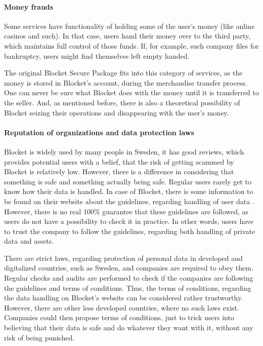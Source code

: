 \paragraph{Money frauds}
Some services have functionality of holding some of the user's money (like online casinos and such). In that case, users hand their money over to the third party, which maintains full control of those funds. If, for example, such company files for bankruptcy, users might find themselves left empty handed.

The original Blocket Secure Package fits into this category of services, as the money is stored in Blocket's account, during the merchandise transfer process. One can never be sure what Blocket does with the money until it is transferred to the seller. And, as mentioned before, there is also a theoretical possibility of Blocket seizing their operations and disappearing with the user's money.

\paragraph{Reputation of organizations and data protection laws}
Blocket is widely used by many people in Sweden, it has good reviews, which provides potential users with a belief, that the risk of getting scammed by Blocket is relatively low. However, there is a difference in considering that something is safe and something actually being safe. Regular users rarely get to know how their data is handled. In case of Blocket, there is some information to be found on their website about the guidelines, regarding handling of user data \citep{blocketuserdata}. However, there is no real 100\% guarantee that these guidelines are followed, as users do not have a possibility to check it in practice. In other words, users have to trust the company to follow the guidelines, regarding both handling of private data and assets. 

There are strict laws, regarding protection of personal data in developed and digitalized countries, such as Sweden, and companies are required to obey them. Regular checks and audits are performed to check if the companies are following the guidelines and terms of conditions. Thus, the terms of conditions, regarding the data handling on Blocket's website can be considered rather trustworthy. However, there are other less developed countries, where no such laws exist. Companies could then propose terms of conditions, just to trick users into believing that their data is safe and do whatever they want with it, without any risk of being punished. 

